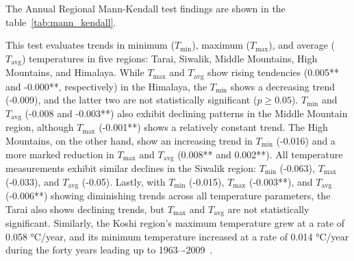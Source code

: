The Annual Regional Mann-Kendall test findings are shown in the table~\ref{tab:mann_kendall}.

This test evaluates trends in minimum (\(T_{\text{min}}\)), maximum (\(T_{\text{max}}\)), and average (\(T_{\text{avg}}\)) temperatures in five regions: Tarai, Siwalik, Middle Mountains, High Mountains, and Himalaya. While \(T_{\text{max}}\) and \(T_{\text{avg}}\) show rising tendencies (0.005** and -0.000**, respectively) in the Himalaya, the \(T_{\text{min}}\) shows a decreasing trend (-0.009), and the latter two are not statistically significant (\(p \geq 0.05\)). \(T_{\text{min}}\) and \(T_{\text{avg}}\) (-0.008 and -0.003**) also exhibit declining patterns in the Middle Mountain region, although \(T_{\text{max}}\) (-0.001**) shows a relatively constant trend. The High Mountains, on the other hand, show an increasing trend in \(T_{\text{min}}\) (-0.016) and a more marked reduction in \(T_{\text{max}}\) and \(T_{\text{avg}}\) (0.008** and 0.002**). All temperature measurements exhibit similar declines in the Siwalik region: \(T_{\text{min}}\) (-0.063), \(T_{\text{max}}\) (-0.033), and \(T_{\text{avg}}\) (-0.05). Lastly, with \(T_{\text{min}}\) (-0.015), \(T_{\text{max}}\) (-0.003**), and \(T_{\text{avg}}\) (-0.006**) showing diminishing trends across all temperature parameters, the Tarai also shows declining trends, but \(T_{\text{max}}\) and \(T_{\text{avg}}\) are not statistically significant. Similarly, the Koshi region's maximum temperature grew at a rate of 0.058 °C/year, and its minimum temperature increased at a rate of 0.014 °C/year during the forty years leading up to 1963–-2009~\parencite{nepal_impacts_2016}.





